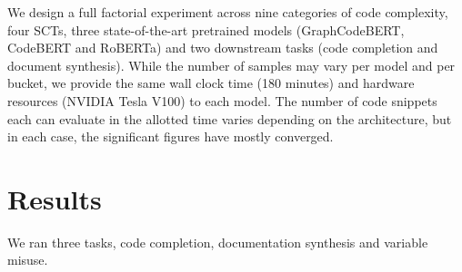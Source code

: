 \documentclass[usenames,dvipsnames]{article} %
\begin{document}
  We design a full factorial experiment across nine categories of code complexity, four SCTs, three state-of-the-art pretrained models (GraphCodeBERT, CodeBERT and RoBERTa) and two downstream tasks (code completion and document synthesis). While the number of samples may vary per model and per bucket, we provide the same wall clock time (180 minutes) and hardware resources (NVIDIA Tesla V100) to each model. The number of code snippets each can evaluate in the allotted time varies depending on the architecture, but in each case, the significant figures have mostly converged.

  \section{Results}\label{sec:results}

  We ran three tasks, code completion, documentation synthesis and variable misuse.

  \begin{center}
  \begin{table}[H]
  \caption{\label{tab:code-comp}Mean and standard deviation for single-token code completion accuracy.}
  \end{table}
  \end{center}
\end{document}
